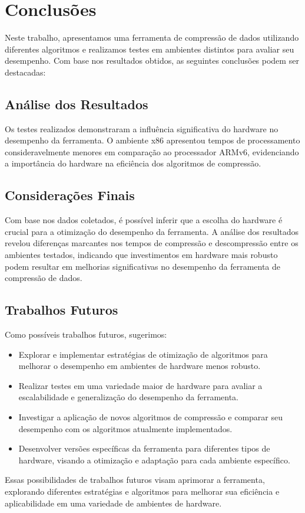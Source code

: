 \chapter{Conclusões}
\label{cap:conclusoes}

Neste trabalho, apresentamos uma ferramenta de compressão de dados utilizando diferentes algoritmos e realizamos testes em ambientes distintos para avaliar seu desempenho. Com base nos resultados obtidos, as seguintes conclusões podem ser destacadas:

\section{Análise dos Resultados}

Os testes realizados demonstraram a influência significativa do hardware no desempenho da ferramenta. O ambiente x86 apresentou tempos de processamento consideravelmente menores em comparação ao processador ARMv6, evidenciando a importância do hardware na eficiência dos algoritmos de compressão.

\section{Considerações Finais}

Com base nos dados coletados, é possível inferir que a escolha do hardware é crucial para a otimização do desempenho da ferramenta. A análise dos resultados revelou diferenças marcantes nos tempos de compressão e descompressão entre os ambientes testados, indicando que investimentos em hardware mais robusto podem resultar em melhorias significativas no desempenho da ferramenta de compressão de dados.

\section{Trabalhos Futuros}

Como possíveis trabalhos futuros, sugerimos:
\begin{itemize}
    \item Explorar e implementar estratégias de otimização de algoritmos para melhorar o desempenho em ambientes de hardware menos robusto.
    \item Realizar testes em uma variedade maior de hardware para avaliar a escalabilidade e generalização do desempenho da ferramenta.
    \item Investigar a aplicação de novos algoritmos de compressão e comparar seu desempenho com os algoritmos atualmente implementados.
    \item Desenvolver versões específicas da ferramenta para diferentes tipos de hardware, visando a otimização e adaptação para cada ambiente específico.
\end{itemize}

Essas possibilidades de trabalhos futuros visam aprimorar a ferramenta, explorando diferentes estratégias e algoritmos para melhorar sua eficiência e aplicabilidade em uma variedade de ambientes de hardware.
